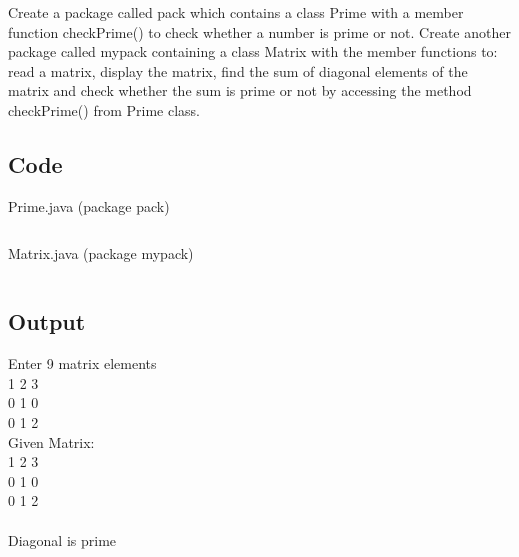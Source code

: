 \documentclass[../main.tex]{subfiles}
\begin{document}
Create a package called pack which contains a class Prime with a member
function checkPrime() to check whether a number is prime or not. Create another
package called mypack containing a class Matrix with the member functions to:
read a matrix, display the matrix, find the sum of diagonal elements of the
matrix and check whether the sum is prime or not by accessing the method
checkPrime() from Prime class.

\subsection{Code}
Prime.java (package pack)
\inputminted[frame=lines, breaklines, breakanywhere, numberblanklines=false]{java}{./programs/prog3/pack/Prime.java}
Matrix.java (package mypack)
\inputminted[frame=lines, breaklines, breakanywhere, numberblanklines=false]{java}{./programs/prog3/mypack/Matrix.java}

\subsection{Output}
Enter 9 matrix elements \\
1 2 3 \\
0 1 0 \\
0 1 2 \\
Given Matrix: \\
1 2 3 \\
0 1 0 \\
0 1 2 \\
\\
Diagonal is prime \\
\end{document}
